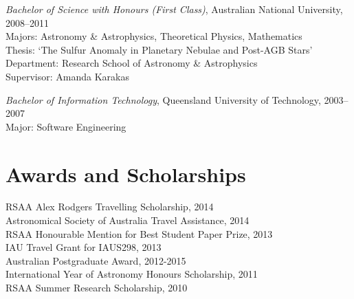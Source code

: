 \documentclass[11pt]{res} %
\begin{document}
\begin{resume}
  {\it Bachelor of Science with Honours (First Class)}, Australian National University, 2008--2011\\
  Majors: Astronomy \& Astrophysics, Theoretical Physics, Mathematics\\
  Thesis: `The Sulfur Anomaly in Planetary Nebulae and Post-AGB Stars'\\
  Department: Research School of Astronomy \& Astrophysics\\
  Supervisor: Amanda Karakas


  {\it Bachelor of Information Technology}, Queensland University of Technology, 2003--2007\\
  Major: Software Engineering

\section{Awards and Scholarships}
  RSAA Alex Rodgers Travelling Scholarship, 2014\\
  Astronomical Society of Australia Travel Assistance, 2014\\
  RSAA Honourable Mention for Best Student Paper Prize, 2013\\
  IAU Travel Grant for IAUS298, 2013\\
  Australian Postgraduate Award, 2012-2015\\
  International Year of Astronomy Honours Scholarship, 2011\\
  RSAA Summer Research Scholarship, 2010


\end{resume}
\end{document}
